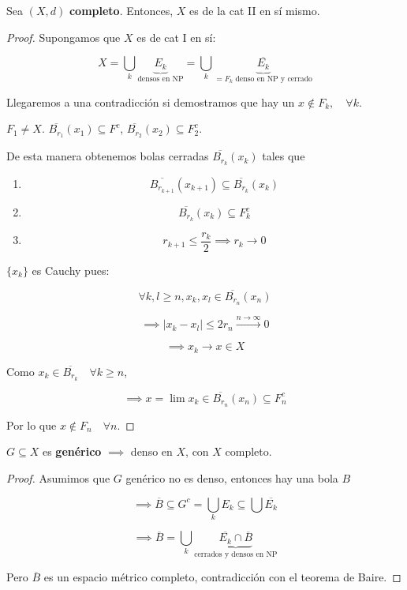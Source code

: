 \begin{ftheorem}
    Sea $(X,d)$ \textbf{completo}. Entonces, $X$ es de la cat II en sí mismo.
\end{ftheorem}

\begin{proof}
    Supongamos que $X$ es de cat I en sí:

    \[X=\bigcup_{k} \underbrace{E_k}_{\text{densos en NP}}=\bigcup_{k} \underbrace{\overline{E_k}}_{=F_k \text{ denso en NP y cerrado}}\]

    Llegaremos a una contradicción si demostramos que hay un $x\not\in F_k,\quad \forall k$.

    $F_1\neq X$. $\overline{B_{r_1}}(x_1)\subseteq F^c$, $\overline{B_{r_2}}(x_2)\subseteq F_2^c$.

    De esta manera obtenemos bolas cerradas $\overline{B_{r_k}}(x_k)$ tales que

    \begin{enumerate}
        \item \[\overline{B_{r_{k+1}}}(x_{k+1})\subseteq \overline{B_{r_k}}(x_k)\]
        \item \[\overline{B_{r_k}}(x_k)\subseteq F_k^c\]
        \item \[r_{k+1}\leq \frac{r_k}{2}\implies r_k\to 0\]
    \end{enumerate}

    $\{x_k\}$ es Cauchy pues:

    \[\forall k,l\geq n, x_k,x_l\in \overline{B_{r_n}}(x_n)\]

    \[\implies |x_k-x_l|\leq 2 r_n\xrightarrow{n\to\infty} 0\]

    \[\implies x_k\to x\in X\]

    Como $x_k\in \overline{B_{r_k}}\quad \forall k\geq n$,

    \[\implies x=\lim x_k\in \overline{B_{r_n}}(x_n)\subseteq F_n^c\]

    Por lo que $x\not\in F_n\quad \forall n$.
    
\end{proof}

\begin{fcorollary}\label{theo:2.3.2.1}
    $G\subseteq X$ es \textbf{genérico} $\implies$ denso en $X$, con $X$ completo.
\end{fcorollary}

\begin{proof}
    Asumimos que $G$ genérico no es denso, entonces hay una bola $B$

    \[\implies \overline{B}\subseteq G^c=\bigcup_k {E_k}\subseteq \bigcup \overline{E_k}\]

    \[\implies \overline{B}=\bigcup_{k} \underbrace{\overline{E_k}\cap \overline{B}}_{\text{cerrados y densos en NP}}\]

    Pero $\overline{B}$ es un espacio métrico completo, contradicción con el teorema de Baire.
\end{proof}


